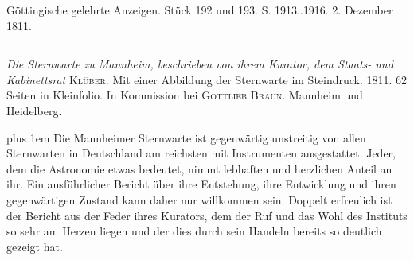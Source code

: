 \hypertarget{native-541-lower}{}\label{native-541-lower}
\begin{center}\small Göttingische gelehrte Anzeigen. Stück 192 und 193. S. 1913..1916. 2. Dezember 1811.\\[3pt]\rule{.72\linewidth}{.3pt}\end{center}

\emph{Die Sternwarte zu Mannheim, beschrieben von ihrem Kurator, dem Staats- und Kabinettsrat} \textsc{Klüber}. Mit einer Abbildung der Sternwarte im Steindruck. 1811. 62 Seiten in Kleinfolio. In Kommission bei \textsc{Gottlieb Braun}. Mannheim und Heidelberg.

{\rightskip=0pt plus 1em
Die Mannheimer Sternwarte ist gegenwärtig unstreitig von allen Sternwarten in Deutschland am reichsten mit Instrumenten ausgestattet. Jeder, dem die Astronomie etwas bedeutet, nimmt lebhaften und herzlichen Anteil an ihr. Ein ausführlicher Bericht über ihre Entstehung, ihre Entwicklung und ihren gegenwärtigen Zustand kann daher nur willkommen sein. Doppelt erfreulich ist der Bericht aus der Feder ihres Kurators, dem der Ruf und das Wohl des Instituts so sehr am Herzen liegen und der dies durch sein Handeln bereits so deutlich gezeigt hat.\par}


